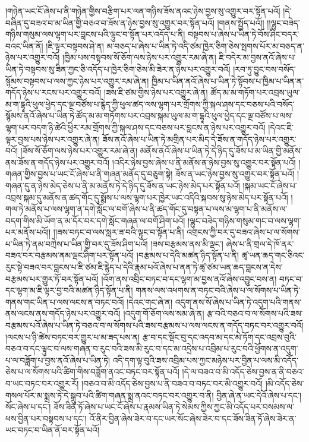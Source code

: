 །གཉེན་ཡང་ངོ་ཞེས་པ་ནི་གཉེན་གྱིས་བརྩིག་པར་ལན་གཉིས་ཟོས་ནའང་ཉེས་བྱས་སུ་འགྱུར་བར་སྟོན་པའོ། །དེ་བཞིན་དུ་བཟའ་བ་མ་ཡིན་གྱི་བཅའ་བ་ཟོས་ན་ཉེས་བྱས་སུ་འགྱུར་བར་སྟོན་པའོ། །གནས་སྤྱོད་པའོ།། །།ལྷུང་བཟེད་གཉིས་གསུམ་ལས་ལྷག་པར་བླངས་པའི་ལྟུང་བ་སྟོན་པར་འདོད་པ་ནི། བསྟབས་པ་ཞེས་པ་ཡིན་ཏེ་བོས་ཤིང་བདར་བའང་ཡིན་ནོ། །ཇི་ལྟར་བསྟབས་ཤེ་ན། མ་བཅད་པ་ཞེས་པ་ཡིན་ཏེ་འདི་ཙམ་ཁྱེར་ཅིག་ཅེས་སྤགས་པོར་མ་བཅད་ན་ཉེས་པར་འགྱུར་བའོ། །ཁྱིམ་པས་བསྟབས་སོ་ཅོག་ལས་ཉེས་པར་འགྱུར་རམ་ཞེ་ན། ཇི་བདེར་མ་བྱས་ནའོ་ཞེས་པ་ཡིན་ཏེ་བསྟབས་སུ་ཟིན་ཀྱང་ཅི་འདོད་པ་ཁྱེར་ཅིག་ཅེས་མི་ཟེར་ན་ཉེས་པར་འགྱུར་བའོ། །རབ་ཏུ་བྱུང་བས་བསོད་སྙོམས་བསྟབས་པ་ལས་ཀྱང་ཉེས་པར་འགྱུར་རམ་ཞེ་ན། ཁྱིམ་པ་ཡིན་ནའོ་ཞེས་པ་ཡིན་ཏེ་སྟོབས་པ་ཁྱིམ་པ་ཡིན་ན་གདོད་ཉེས་པ་རངས་པར་འགྱུར་བའོ། །ཟས་ཇི་ཙམ་གྱིས་ཉེས་པར་འགྱུར་ཞེ་ན། ཚོད་མ་མ་གཏོག་པར་འབྲས་ཡུལ་མ་ག་དྷཱའི་ཕུལ་ཕྱེད་དང་ལྔ་བཙོས་པ་རྙེད་ཀྱི་ཕུལ་ཚད་ལས་ལྷག་པར་གྲོགས་ཀྱི་སྐལ་ཤས་དང་བཅས་པའི་བསོད་སྙོམས་ནའོ་ཞེས་པ་ཡིན་ཏེ་ཚོད་མ་མ་གཏོགས་པར་འབྲས་སྐམ་ཡུལ་མ་ག་དྷཱའི་ཕུལ་ཕྱེད་དང་ལྔ་བཙོས་པ་ལས་ལྷག་པར་བདག་ཉི་ཚེའི་ཕྱིར་རམ་གྲོགས་ཀྱི་སྐལ་ཤས་དང་བཅས་པར་བླངས་ན་ཉེས་པར་འགྱུར་བའོ། །དེའང་ཇི་ལྟར་བྱས་པས་ཉེས་པར་འགྱུར་ཞེ་ན། ཟོས་ནའོ་ཞེས་པ་ཡིན་ཏེ་མགྲིན་པར་མིད་དེ་ཟོས་ན་གདོད་ཉེས་པར་འགྱུར་བའོ། །ཟོས་སོ་ཅོག་ལས་ཉེས་པར་འགྱུར་རམ་ཞེ་ན། མནོས་ནའོ་ཞེས་པ་ཡིན་ཏེ་དེ་ཉིད་དུ་ཟོས་པ་མ་ཡིན་གྱི་མནོས་ནས་ཟོས་ན་གདོད་ཉེས་པར་འགྱུར་བའོ། །འདིར་ཉེས་བྱས་ཞེས་པ་ནི་མནོས་ན་ཉེས་བྱས་སུ་འགྱུར་བར་སྟོན་པའོ། །གཞན་གྱིས་བྱས་པ་ཡང་ངོ་ཞེས་པ་ནི་གཞན་མནོད་དུ་བཅུག་སྟེ། ཟོས་ན་ཡང་ཉེས་བྱས་སུ་འགྱུར་བར་སྟོན་པའོ། །གཞན་དུ་ན་ཉེས་མེད་ཅེས་པ་ནི་མ་མནོས་ཏེ་དེ་ཉིད་དུ་ཟོས་ན་ཡང་ཉེས་མེད་པར་སྟོན་པའོ། །སྐམ་ཡང་ངོ་ཞེས་པ་འབྲས་སྐམ་དུ་མནོས་ན་ཚད་གོང་དུ་སྨོས་པ་ལས་ལྷག་པར་ཁྱེར་ཡང་འདིའི་སྐབས་སུ་ཉེས་མེད་པར་སྟོན་པའོ། །གལ་ཏེ་མནོས་པ་ལས་ལྷག་ན་དགེ་སློང་ལ་བགོ་ཞེས་པ་ནི་ཚད་གོང་དུ་བསྟན་པ་ལས་མ་ལྷག་པ་ནི་མནོས་ལ་བདག་གིས་མི་ཡོག་ན་མ་དོར་བར་དགེ་སློང་གཞན་ལ་བགོ་ཤིག་པའོ། །ལྷུང་བཟེད་གཉིས་གསུམ་གང་བ་ལས་ལྷག་པར་མནོས་པའོ།། །།ཟས་བཏང་བ་ལས་སླར་ཟ་བའི་ལྟུང་བ་སྟོན་པ་ནི། འགྲངས་ཀྱི་བར་དུ་བཟའ་ཞེས་པ་ལ་སོགས་པ་ཡིན་ཏེ་ནམ་བཀྲེས་པ་ཡིན་གྱི་བར་དུ་ཟོས་ཤིག་པའོ། །ཟས་བརྩམས་ནས་མི་ལྡང་། ཞེས་པ་ནི་གྲལ་དེ་ཁོ་ནར་བཟའ་བར་བརྩམས་ནམ་ལྡང་ཤིག་པར་སྟོན་པའོ། །བརྩམས་པ་དེའི་མཚན་ཉིད་སྟོན་པ་ནི། ཚྭ་ཡན་ཆད་གང་ཅིའང་རུང་སྟེ་བཟའ་བར་བླངས་པ་ཇི་ཙམ་ཇི་རྙེད་པ་དེའི་རྣམ་པའོ་ཞེས་པ་ནན་ཏེ་ཚྭ་ཙམ་ཡན་ཆད་བླངས་ན་དེས་བརྩམས་པར་གྱུར་ཏོ་བར་སྟོན་པའོ། །འོག་ནས་འབྲིང་བཏང་བ་དང་ལྷག་མ་བྱས་ནའོ་ཞེས་འབྱུང་བས་ན། བཏང་བ་དང་ལྷག་མ་ཇི་ལྟར་བྱ་བའི་མཚན་ཉིད་སྟོན་པ་ནི། གནས་ལས་འཕགས་ན་བཏང་བའི་ཞེས་པ་ལ་སོགས་པ་ཡིན་ཏེ་གནས་གང་ཡིན་པ་ལས་ལངས་ན་བཏང་བའོ། །དེའང་གང་ཞེ་ན། འདུག་ནས་སོ་ཞེས་པ་ཡིན་ཏེ་འདུག་པའི་གནས་ནས་ལངས་ནས་གདོད་ཉེས་པར་འགྱུར་བའོ། །འདུག་གོ་ཅོག་ལས་སམ་ཞེ་ན། རྩ་བའི་བཅའ་བ་ལ་སོགས་པའི་ཟས་བརྩམས་པའོ་ཞེས་པ་ཡིན་ཏེ་བཅའ་བ་ལ་སོགས་པའི་ཟས་བརྩམས་པ་ལས་ལངས་ན་གདོད་བཏང་བར་འགྱུར་བའོ། །ལངས་པ་ཉི་ཚེས་བཏང་བར་གྱུར་པ་མ་ཟད་པས་ན། རྩ་བ་དང་སྡོང་བུ་དང་འདབ་མ་དང་མེ་ཏོག་དང་འབྲས་བུའི་བཅའ་བ་དང་ལྟུང་བ་ལས་གཞན་བ་རུང་བའི་ཟས་མི་རུང་བ་དང་མ་འདྲེས་པ་འབྲིམ་པ་རུང་བའི་ཕྱོགས་ན་འདུག་པ་ལ་བཟློག་པ་བྱས་ནའོ་ཞེས་པ་ཡིན་ཏེ། འདི་དག་ལྟ་བུའི་ཟས་འབྲིམ་པས་ཀྱང་མཉེས་པར་བྱིན་པ་ལས་མི་འདོད་ཅེས་པ་ལ་སོགས་པའི་ཚིག་གིས་བཟློག་ནའང་བཏང་བར་སྟོན་པའོ། །དེ་ལ་བཟའ་བ་མི་འདོད་ཅེས་བྱས་ན་ནི་བཅའ་བ་ཡང་བཏང་བར་འགྱུར་རོ། །བཅའ་བ་མི་འདོད་ཅེས་བྱས་པ་ནི་བཟའ་བ་བཏང་བར་མི་འགྱུར་བའོ། །མི་འདོད་ཅེས་གསལ་པོར་མ་སྨྲས་ཏེ་དེ་སྒྲུབ་པའི་ཚིག་གཞན་སྨྲ་ནའང་བཏང་བར་འགྱུར་བ་ནི། བྱིན་ཞེ་ན་ཡང་དེའོ་ཞེས་པ་དང་། སོང་ཞེས་པ་དང་། ཟོས་ཟིན་ཏོ་ཞེས་པ་ཡང་ངོ་ཞེས་པ་རྣམས་ཡིན་ཏེ་སེམས་ཀྱིས་ཀྱང་མི་འདོད་པར་བསམས་ལ་ཕས་བྱིན་པར་བསྟབས་པ་དང་། འོ་ནིར་བྱིན་ཞེས་ཟེར་བ་དང་ཡར་སོང་ཞེས་ཟེར་བ་དང་ཟོས་ཟིན་ཏོ་ཞེས་ཟེར་ན་ཡང་བཏང་བ་ཡིན་ནོ་བར་སྟོན་པའོ། 